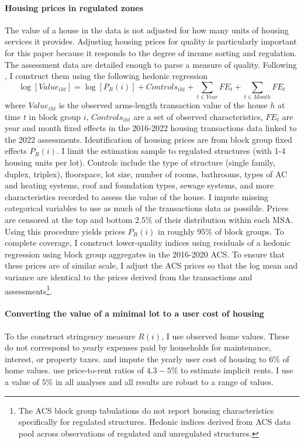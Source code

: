 \documentclass[12pt]{article}
\begin{document}
\paragraph*{Housing prices in regulated zones} The value of a house in the data is not adjusted for how many units of housing services it provides. Adjusting housing prices for quality is particularly important for this paper because it responds to the degree of income sorting and regulation. The assessment data are detailed enough to parse a measure of quality. Following \cite{BSH}, I construct them using the following hedonic regression
\begin{equation}\label{hedonicIndex}
	\log[Value_{iht}] = \log[P_{R}(i)] + Controls_{iht} + \sum_{t \in Year}FE_{t} + \sum_{t \in Month}FE_{t}
\end{equation} 
where $Value_{iht}$ is the observed arms-length transaction value of the house $h$ at time $t$ in block group $i$, $Controls_{iht}$ are a set of observed characteristics, $FE_{t}$ are year and month fixed effects in the 2016-2022 housing transactions data linked to the 2022 assessments. Identification of housing prices are from block group fixed effects $P_{R}(i)$. I limit the estimation sample to regulated structures (with 1-4 housing units per lot). Controls include the type of structure (single family, duplex, triplex), floorspace, lot size, number of rooms, bathrooms, types of AC and heating systems, roof and foundation types, sewage systems, and more characteristics recorded to assess the value of the house. I impute missing categorical variables to use as much of the transactions data as possible. Prices are censored at the top and bottom $2.5\%$ of their distribution within each MSA. Using this procedure yields prices $P_{R}(i)$ in roughly 95\% of block groups. To complete coverage, I construct lower-quality indices using residuals of a hedonic regression using block group aggregates in the 2016-2020 ACS. To ensure that these prices are of similar scale, I adjust the ACS prices so that the log mean and variance are identical to the prices derived from the transactions and assessments\footnote{The ACS block group tabulations do not report housing characteristics specifically for regulated structures. Hedonic indices derived from ACS data pool across observations of regulated and unregulated structures.}.

\paragraph*{Converting the value of a minimal lot to a user cost of housing} To the construct stringency measure $R(i)$, I use observed home values. These do not correspond to yearly expenses paid by households for maintenance, interest, or property taxes. \cite{AttanasioPistaferri} and \cite{straub2019} impute the yearly user cost of housing to $6\%$ of home values. \cite{Coutureetal} use price-to-rent ratios of $4.3 - 5\%$ to estimate implicit rents. I use a value of $5\%$ in all analyses and all results are robust to a range of values.  
\end{document}
